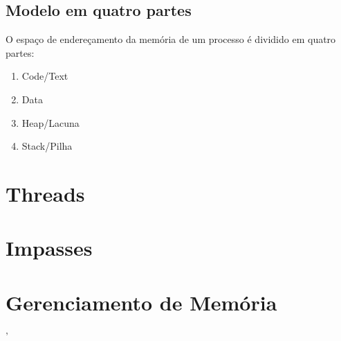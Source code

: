 \documentclass[ ]{article}
\begin{document}
		\subsection{Modelo em quatro partes}
		O espaço de endereçamento da memória de um processo é dividido em quatro partes:
			\begin{enumerate}
				\item Code/Text
				\item Data
				\item Heap/Lacuna
				\item Stack/Pilha
			\end{enumerate}
	\section{Threads}
	\section{Impasses}
	\section{Gerenciamento de Memória}'
\end{document}
